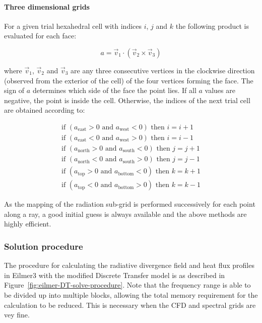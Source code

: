 \paragraph{Three dimensional grids}

For a given trial hexahedral cell with indices $i$, $j$ and $k$ the following product is evaluated for each face:

\begin{equation}
 a = \vec{v}_1 \cdot \left ( \vec{v}_2 \times \vec{v}_3 \right )
\end{equation}

\noindent where $\vec{v}_1$, $\vec{v}_2$ and $\vec{v}_3$ are any three consecutive vertices in the clockwise direction (observed from the exterior of the cell) of the four vertices forming the face.
The sign of $a$ determines which side of the face the point lies.
If all $a$ values are negative, the point is inside the cell.
Otherwise, the indices of the next trial cell are obtained according to:

\begin{eqnarray}
 \text{if } \left ( a_\text{east} > 0 \text{ and } a_\text{west} < 0 \right ) \text{ then } i = i + 1 \\ 
 \text{if } \left ( a_\text{east} < 0 \text{ and } a_\text{west} > 0 \right ) \text{ then } i = i - 1 \\ 
 \text{if } \left ( a_\text{north} > 0 \text{ and } a_\text{south} < 0 \right ) \text{ then } j = j + 1 \\ 
 \text{if } \left ( a_\text{north} < 0 \text{ and } a_\text{south} > 0 \right ) \text{ then } j = j - 1 \\ 
 \text{if } \left ( a_\text{top} > 0 \text{ and } a_\text{bottom} < 0 \right ) \text{ then } k = k + 1 \\ 
 \text{if } \left ( a_\text{top} < 0 \text{ and } a_\text{bottom} > 0 \right ) \text{ then } k = k - 1 
\end{eqnarray}

\noindent As the mapping of the radiation sub-grid is performed successively for each point along a ray, a good initial guess is always available and the above methods are highly efficient.

\subsubsection{Solution procedure}

The procedure for calculating the radiative divergence field and heat flux profiles in Eilmer3  with the modified Discrete Transfer model is as described in Figure~\ref{fig:eilmer-DT-solve-procedure}.
Note that the frequency range is able to be divided up into multiple blocks, allowing the total memory requirement for the calculation to be reduced.
This is necessary when the CFD and spectral grids are vey fine.

